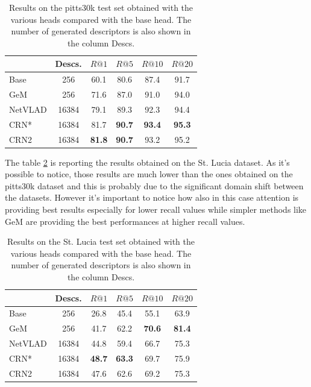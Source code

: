 \documentclass[10pt,twocolumn,letterpaper]{article}
\begin{document}
\begin{table}
	\centering
	\begin{tabular}{|l|c|c|c|c|c|}
		\hline
		& Descs.&        $R@1$   &        $R@5$   &        $R@10$  &        $R@20$   \\ \hline
		Base     & 256   &         60.1   &         80.6   &          87.4   &          91.7   \\
		GeM      & 256   &         71.6   &         87.0   &          91.0   &          94.0   \\
		NetVLAD  & 16384 &         79.1   &         89.3   &          92.3   &          94.4   \\ \hline
		CRN*     & 16384 &         81.7   & \textbf{90.7}  &  \textbf{93.4}  &  \textbf{95.3}  \\
		CRN2     & 16384 &\textbf{81.8}   & \textbf{90.7}  &          93.2   &          95.2   \\ \hline
	\end{tabular}
	\caption{Results on the pitts30k test set obtained with the various heads compared with the base head. The number of generated descriptors 
		is also shown in the column Descs.}
	\label{tab:base_results}
\end{table}

The table \ref{tab:base_results:st_lucia} is reporting the results obtained on the St. Lucia dataset. As it's possible to notice, 
those results are much lower than the ones obtained on the pitts30k dataset and this is probably due to the significant domain shift between the datasets.
However it's important to notice how also in this case attention is providing best results especially for lower recall values while
simpler methods like GeM are providing the best performances at higher recall values. 
\begin{table}
	\centering
	\begin{tabular}{|l|c|c|c|c|c|}
		\hline
		& Descs.&        $R@1$   &        $R@5$   &        $R@10$  &        $R@20$   \\ \hline
		Base     & 256   &         26.8   &         45.4   &          55.1   &          63.9   \\
		GeM      & 256   &         41.7   &         62.2   &  \textbf{70.6}  &  \textbf{81.4}   \\
		NetVLAD  & 16384 &         44.8   &         59.4   &          66.7   &          75.3   \\ \hline
		CRN*     & 16384 & \textbf{48.7}  & \textbf{63.3}  &          69.7   &          75.9  \\
		CRN2     & 16384 &         47.6   &         62.6   &          69.2   &          75.3   \\ \hline
	\end{tabular}
	\caption{Results on the St. Lucia test set obtained with the various heads compared with the base head. The number of generated descriptors 
		is also shown in the column Descs.}
	\label{tab:base_results:st_lucia}
\end{table}
\end{document}

